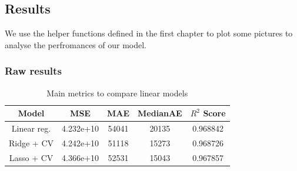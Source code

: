 \subsection{Results}
We use the helper functions defined in the first chapter to plot some pictures to analyse the perfromances of our model.

\subsubsection{Raw results}
\begin{table}[h]
    \centering
    \begin{tabular}{ccccc}
        \toprule
        Model &  MSE &  MAE & MedianAE & $R^2$ Score \\
        \midrule
        Linear reg. & 4.232e+10 & 54041 & 20135 & 0.968842\\
        Ridge + CV & 4.242e+10 & 51118 & 15273 & 0.968726\\
        Lasso + CV & 4.366e+10 & 52531 & 15043 & 0.967857\\
        \bottomrule
    \end{tabular}
    \caption{Main metrics to compare linear models}
\end{table}
